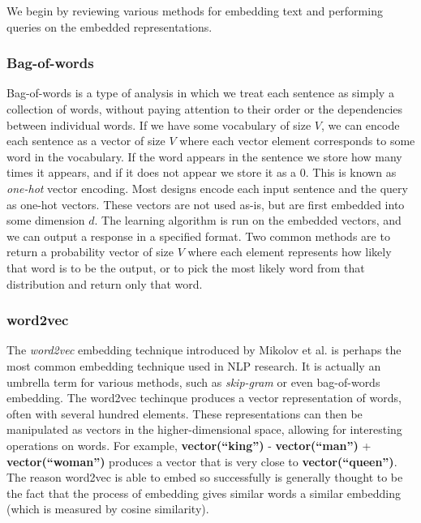 \documentclass[pageno]{jpaper}
\begin{document}
We begin by reviewing various methods for embedding text and performing queries
on the embedded representations. \\

\subsubsection{Bag-of-words}
\label{Bag-of-words}

Bag-of-words is a type of analysis in which we treat each sentence as simply a
collection of words, without paying attention to their order or the dependencies
between individual words. If we have some vocabulary of size $V$, we can encode
each sentence as a vector of size $V$ where each vector element corresponds to
some word in the vocabulary. If the word appears in the sentence we store how
many times it appears, and if it does not appear we store it as a 0. This is
known as \textit{one-hot} vector encoding. Most designs encode each input
sentence and the query as one-hot vectors. These vectors are not used as-is, but
are first embedded into some dimension $d$. The learning algorithm is run on the
embedded vectors, and we can output a response in a specified format. Two common
methods are to return a probability vector of size $V$ where each element
represents how likely that word is to be the output, or to pick the most likely
word from that distribution and return only that word. \\

\subsubsection{word2vec}
\label{word2vec}

The \textit{word2vec} embedding technique introduced by Mikolov et al.
\cite{Mikolov2013} is perhaps the most common embedding technique used in NLP
research. It is actually an umbrella term for various methods, such as
\textit{skip-gram} or even bag-of-words embedding. The word2vec techinque
produces a vector representation of words, often with several hundred elements.
These representations can then be manipulated as vectors in the
higher-dimensional space, allowing for interesting operations on words. For
example, \textbf{vector(``king'')} - \textbf{vector(``man'')} +
\textbf{vector(``woman'')} produces a vector that is very close to
\textbf{vector(``queen'')}. The reason word2vec is able to embed so successfully
is generally thought to be the fact that the process of embedding gives
similar words a similar embedding (which is measured by cosine similarity). \\
\end{document}

